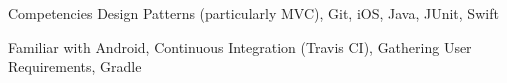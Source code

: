 


\begin{cvskills}


  \cvskill
  {Competencies}
  {Design Patterns (particularly MVC), Git, iOS, Java, JUnit, Swift}


  \cvskill
  {Familiar with}
  {Android, Continuous Integration (Travis CI), Gathering User Requirements, Gradle}


\end{cvskills}